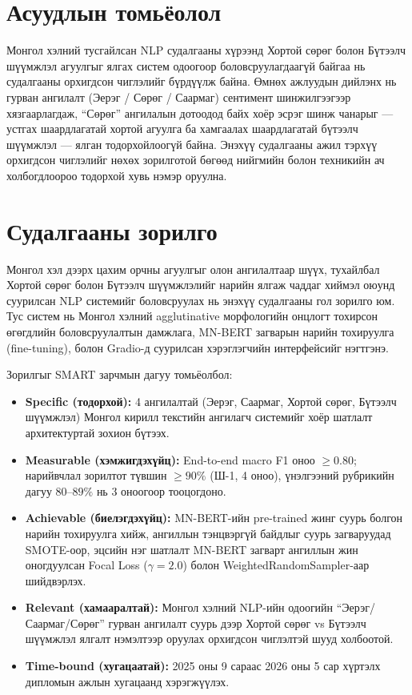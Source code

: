 \section{Асуудлын томьёолол}

Монгол хэлний тусгайлсан NLP судалгааны хүрээнд Хортой сөрөг болон Бүтээлч шүүмжлэл
агуулгыг ялгах систем одоогоор боловсруулагдаагүй байгаа нь судалгааны
орхигдсон чиглэлийг бүрдүүлж байна. Өмнөх ажлуудын дийлэнх нь гурван ангилалт
(Эерэг / Сөрөг / Саармаг) сентимент шинжилгээгээр хязгаарлагдаж,
``Сөрөг'' ангилалын дотоодод байх хоёр эсрэг шинж чанарыг --- устгах
шаардлагатай хортой агуулга ба хамгаалах шаардлагатай бүтээлч шүүмжлэл ---
ялган тодорхойлоогүй байна. Энэхүү судалгааны ажил тэрхүү орхигдсон чиглэлийг нөхөх
зорилготой бөгөөд нийгмийн болон техникийн ач холбогдлоороо тодорхой хувь
нэмэр оруулна.

\section{Судалгааны зорилго}

Монгол хэл дээрх цахим орчны агуулгыг олон ангилалтаар шүүх, тухайлбал Хортой сөрөг
болон Бүтээлч шүүмжлэлийг нарийн ялгаж чаддаг хиймэл оюунд суурилсан
NLP системийг боловсруулах нь энэхүү судалгааны гол зорилго юм. Тус систем нь
Монгол хэлний agglutinative морфологийн онцлогт тохирсон өгөгдлийн
боловсруулалтын дамжлага, MN-BERT загварын нарийн тохируулга (fine-tuning),
болон Gradio-д суурилсан хэрэглэгчийн интерфейсийг нэгтгэнэ.

Зорилгыг SMART зарчмын дагуу томьёолбол:

\begin{itemize}
  \item \textbf{Specific (тодорхой):} 4 ангилалтай (Эерэг, Саармаг, Хортой сөрөг,
    Бүтээлч шүүмжлэл) Монгол кирилл текстийн ангилагч
    системийг хоёр шатлалт архитектуртай зохион бүтээх.
  \item \textbf{Measurable (хэмжигдэхүйц):} End-to-end macro F1 оноо $\geq 0.80$;
    нарийвчлал зорилтот түвшин $\geq 90\%$ (Ш-1, 4 оноо), үнэлгээний рубрикийн
    дагуу $80$--$89\%$ нь 3 оноогоор тооцогдоно.
  \item \textbf{Achievable (биелэгдэхүйц):} MN-BERT-ийн pre-trained жинг
    суурь болгон нарийн тохируулга хийж, ангиллын тэнцвэргүй байдлыг суурь
    загваруудад SMOTE-оор, эцсийн нэг шатлалт MN-BERT загварт ангиллын жин
    оногдуулсан Focal Loss ($\gamma{=}2.0$) болон WeightedRandomSampler-аар
    шийдвэрлэх.
  \item \textbf{Relevant (хамааралтай):} Монгол хэлний NLP-ийн одоогийн
    ``Эерэг/Саармаг/Сөрөг'' гурван ангилалт суурь дээр Хортой сөрөг vs
    Бүтээлч шүүмжлэл ялгалт нэмэлтээр оруулах орхигдсон чиглэлтэй шууд холбоотой.
  \item \textbf{Time-bound (хугацаатай):} 2025 оны 9 сараас 2026 оны 5 сар
    хүртэлх дипломын ажлын хугацаанд хэрэгжүүлэх.
\end{itemize}

